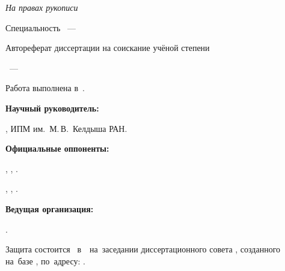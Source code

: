 \thispagestyle{empty}
\begingroup
\setlength{\parindent}{0pt}
\begin{flushright}
\textit{На правах рукописи}
\end{flushright}
\vspace*{42mm}
\begin{center}
{\normalfont\normalsize \thesisAuthor\par}
\vspace{18mm}
{\bfseries\normalsize\MakeUppercase{\thesisTitle}\par}
\vspace{22mm}
Специальность \thesisSpecialtyNumber~--- \thesisSpecialtyTitle
\vspace{20mm}

Автореферат диссертации на соискание учёной степени\par
\thesisDegree
\end{center}
\vfill
{\centering\thesisCity~--- \thesisYear\par}
\endgroup

\newpage
\thispagestyle{empty}
\begingroup
\setlength{\parindent}{0pt}
\setlength{\parskip}{0pt}
\noindent Работа выполнена в~\thesisInOrganization.

\vspace{6mm}
\textbf{Научный руководитель:}\par\nobreak\vspace{2mm}
\textbf{\supervisorFio}, \supervisorRegalia\space
ИПМ им.~М.\,В.~Келдыша РАН.

\vspace{6mm}
\textbf{Официальные оппоненты:}\par\nobreak\vspace{2mm}
\textbf{\opponentOneFio}, \opponentOneRegalia,
\opponentOneJobPost\space\synopsisOpponentOneJobPlaceGenitive.

\vspace{4mm}
\textbf{\opponentTwoFio}, \opponentTwoRegalia,
\opponentTwoJobPost\space\synopsisOpponentTwoJobPlaceGenitive.

\vspace{6mm}
\textbf{Ведущая организация:}\par\nobreak\vspace{2mm}
\leadingOrganizationTitle.

\vspace{8mm}
Защита состоится ~в~\synopsisDefenseTime~на~заседании диссертационного совета , созданного на~базе , по~адресу: .

